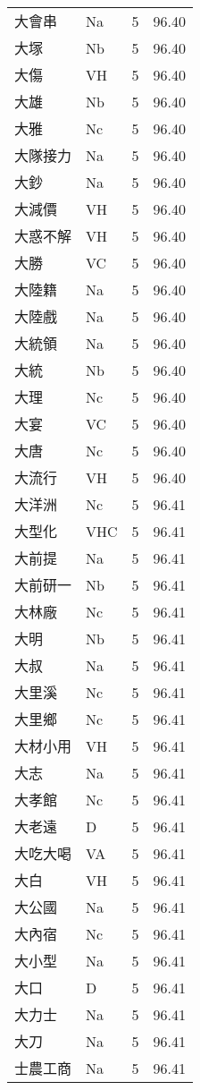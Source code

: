 \documentclass[twocolumn]{book}
\begin{document}
\begin{supertabular}{llrr}
大會串 & Na & 5 &  96.40\\
大塚 & Nb & 5 &  96.40\\
大傷 & VH & 5 &  96.40\\
大雄 & Nb & 5 &  96.40\\
大雅 & Nc & 5 &  96.40\\
大隊接力 & Na & 5 &  96.40\\
大鈔 & Na & 5 &  96.40\\
大減價 & VH & 5 &  96.40\\
大惑不解 & VH & 5 &  96.40\\
大勝 & VC & 5 &  96.40\\
大陸籍 & Na & 5 &  96.40\\
大陸戲 & Na & 5 &  96.40\\
大統領 & Na & 5 &  96.40\\
大統 & Nb & 5 &  96.40\\
大理 & Nc & 5 &  96.40\\
大宴 & VC & 5 &  96.40\\
大唐 & Nc & 5 &  96.40\\
大流行 & VH & 5 &  96.40\\
大洋洲 & Nc & 5 &  96.41\\
大型化 & VHC & 5 &  96.41\\
大前提 & Na & 5 &  96.41\\
大前研一 & Nb & 5 &  96.41\\
大林廠 & Nc & 5 &  96.41\\
大明 & Nb & 5 &  96.41\\
大叔 & Na & 5 &  96.41\\
大里溪 & Nc & 5 &  96.41\\
大里鄉 & Nc & 5 &  96.41\\
大材小用 & VH & 5 &  96.41\\
大志 & Na & 5 &  96.41\\
大孝館 & Nc & 5 &  96.41\\
大老遠 & D & 5 &  96.41\\
大吃大喝 & VA & 5 &  96.41\\
大白 & VH & 5 &  96.41\\
大公國 & Na & 5 &  96.41\\
大內宿 & Nc & 5 &  96.41\\
大小型 & Na & 5 &  96.41\\
大口 & D & 5 &  96.41\\
大力士 & Na & 5 &  96.41\\
大刀 & Na & 5 &  96.41\\
士農工商 & Na & 5 &  96.41\\

\end{supertabular}
\end{document}
